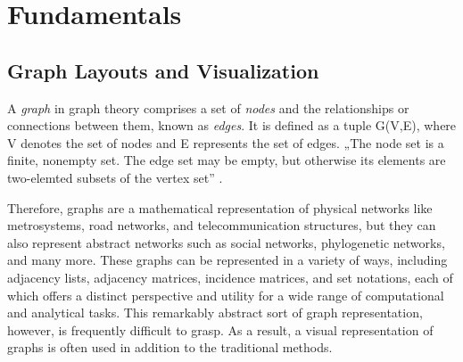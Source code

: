 \documentclass[bachelor, english]{algothesis}
\begin{document}
\chapter{Fundamentals}

\section{Graph Layouts and Visualization}
\begin{definition}
    A \emph{graph} in graph theory comprises a set of \emph{nodes} and the relationships or connections between them, known as \emph{edges}. It is defined as a tuple G(V,E), where V denotes the set of nodes and E represents the set of edges. „The node set is a finite, nonempty set. The edge set may be empty, but otherwise its elements are two-elemted subsets of the vertex set” \cite{graph_definition}.
\end{definition}   
\noindent 
Therefore, graphs are a mathematical representation of physical networks like metrosystems, road networks, and telecommunication structures, but they can also represent abstract networks such as social networks, phylogenetic networks, and many more. These graphs can be represented in a variety of ways, including adjacency lists, adjacency matrices, incidence matrices, and set notations, each of which offers a distinct perspective and utility for a wide range of computational and analytical tasks. This remarkably abstract sort of graph representation, however, is frequently difficult to grasp. As a result, a visual representation of graphs is often used in addition to the traditional methods.
\end{document}
